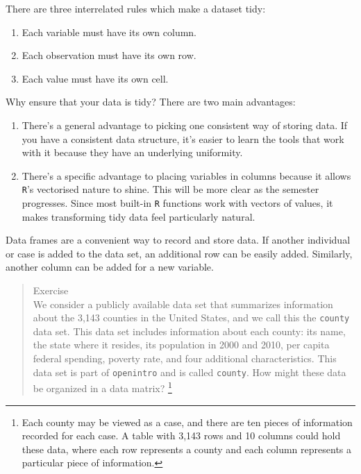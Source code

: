 \documentclass[
]{article}
\providecommand{\tightlist}{%
  \setlength{\itemsep}{0pt}\setlength{\parskip}{0pt}}
\begin{document}
There are three interrelated rules which make a dataset tidy:

\begin{enumerate}
\def\labelenumi{\arabic{enumi}.}
\tightlist
\item
  Each variable must have its own column.\\
\item
  Each observation must have its own row.\\
\item
  Each value must have its own cell.
\end{enumerate}

Why ensure that your data is tidy? There are two main advantages:

\begin{enumerate}
\def\labelenumi{\arabic{enumi}.}
\item
  There's a general advantage to picking one consistent way of storing
  data. If you have a consistent data structure, it's easier to learn
  the tools that work with it because they have an underlying
  uniformity.
\item
  There's a specific advantage to placing variables in columns because
  it allows \texttt{R}'s vectorised nature to shine. This will be more
  clear as the semester progresses. Since most built-in \texttt{R}
  functions work with vectors of values, it makes transforming tidy data
  feel particularly natural.
\end{enumerate}

Data frames are a convenient way to record and store data. If another
individual or case is added to the data set, an additional row can be
easily added. Similarly, another column can be added for a new variable.

\begin{quote}
Exercise\\
We consider a publicly available data set that summarizes information
about the 3,143 counties in the United States, and we call this the
\texttt{county} data set. This data set includes information about each
county: its name, the state where it resides, its population in 2000 and
2010, per capita federal spending, poverty rate, and four additional
characteristics. This data set is part of \texttt{openintro} and is
called \texttt{county}. How might these data be organized in a data
matrix? \footnote{Each county may be viewed as a case, and there are ten
  pieces of information recorded for each case. A table with 3,143 rows
  and 10 columns could hold these data, where each row represents a
  county and each column represents a particular piece of information.}
\end{quote}
\end{document}
